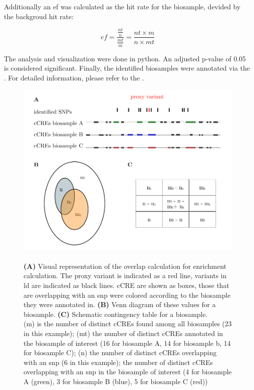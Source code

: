 Additionally an \ac{ef} was calculated as the hit rate for the biosample, devided by the backgroud hit rate:

$$ ef = \frac{\frac{nt}{n}}{\frac{mt}{m}} = \frac{nt\times m}{n\times mt}$$

The analysis and visualization were done in python. An adjusted p-value of 0.05 is considered significant. Finally, the identified biosamples were annotated via the . For detailed information, please refer to the .

\begin{figure}[h]
\capstart
    \centering
    \includegraphics{Abbildung/enrichment.pdf}

    \begin{minipage}{\captionwidth}
        \caption[enrichment]{\\
        \textbf{(A)} Visual representation of the overlap calculation for enrichment calculation. The proxy variant is indicated as a red line, variants in \ac{ld} are indicated as black lines. \ac{cCRE} are shown as boxes, those that are overlapping with an \ac{snp} were colored according to the biosample they were annotated in. \textbf{(B)} Venn diagram of these values for a biosample. \textbf{(C)} Schematic contingency table for a biosample. \\
        (m) is the number of distinct \acp{cCRE} found among all biosamples (23 in this example); (mt) the number of distinct \acp{cCRE} annotated in the biosample of interest (16 for biosample A, 14 for biosample b, 14 for biosample C); (n) the number of distinct \acp{cCRE} overlapping with an \ac{snp} (6 in this example);  the number of distinct \acp{cCRE} overlapping with an \ac{snp} in the biosample of interest (4 for biosample A (green), 3 for biosample B (blue), 5 for biosample C (red))}
        \label{fig:enrichment}
    \end{minipage}
\end{figure}

